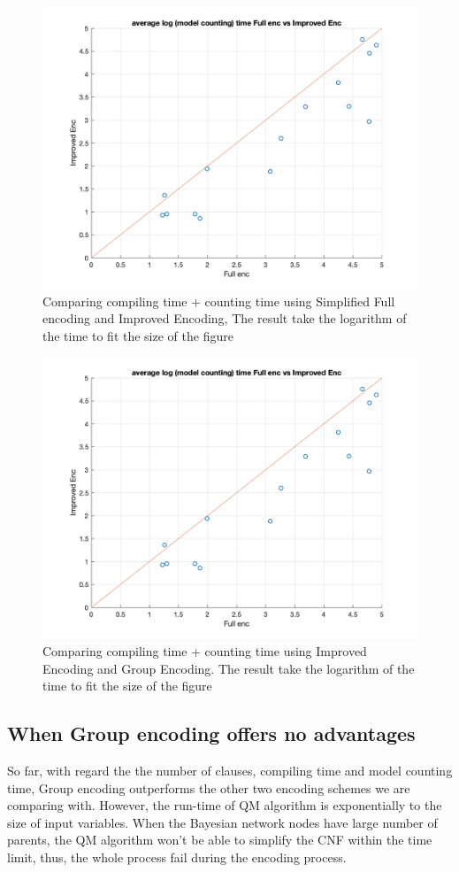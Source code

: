 \begin{figure}
    \centering
    \includegraphics[width = 0.7 \textwidth]{pic/log_time_fullvsImproved.png}
    \caption{Comparing compiling time + counting time using Simplified Full encoding and Improved Encoding, The result take the logarithm of the time to fit the size of the figure}
    \label{fig:time_enc1v2}
\end{figure}

\begin{figure}
    \centering
    \includegraphics[width = 0.7 \textwidth]{pic/log_time_fullvsImproved.png}
    \caption{Comparing compiling time + counting time using Improved Encoding and Group Encoding. The result take the logarithm of the time to fit the size of the figure}
    \label{fig:time_enc2v3}
\end{figure}

\subsection{When Group encoding offers no advantages}
So far, with regard the the number of clauses, compiling time and model counting time, Group encoding outperforms the other two encoding schemes we are comparing with. However, the run-time of QM algorithm is exponentially to the size of input variables. When the Bayesian network nodes have large number of parents, the QM algorithm won't be able to simplify the CNF within the time limit, thus, the whole process fail during the encoding process.

